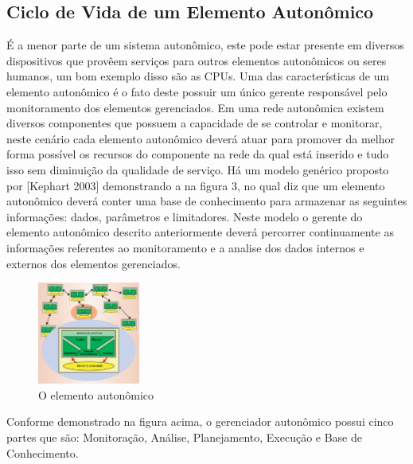 \documentclass[11pt,twoside]{article}
\begin{document}
\subsection{Ciclo de Vida de um Elemento Autonômico}
É a menor parte de um sistema autonômico, este pode estar presente em diversos dispositivos que provêem serviços para outros elementos autonômicos ou seres humanos, um bom exemplo disso são as CPUs. Uma das características de um elemento autonômico é o fato deste possuir um único gerente responsável pelo monitoramento dos elementos gerenciados. 
Em uma rede autonômica existem diversos componentes que possuem a capacidade de se controlar e monitorar, neste cenário cada elemento autonômico deverá atuar para promover da melhor forma possível os recursos do componente na rede da qual está inserido e tudo isso sem diminuição da qualidade de serviço.
Há um modelo genérico proposto por [Kephart 2003] demonstrando a na figura 3, no qual diz que um elemento autonômico deverá conter uma base de conhecimento para armazenar as seguintes informações: dados, parâmetros e limitadores. Neste modelo o gerente do elemento autonômico descrito anteriormente deverá percorrer continuamente as informações referentes ao monitoramento e a analise dos dados internos e externos dos elementos gerenciados.

\begin{figure}
    \centering
    \includegraphics[width=0.3\textwidth]{Picture3.png}
    \centering
    \caption{O elemento autonômico}
    \label{Sec:Intro:Fig1}
\end{figure}

Conforme demonstrado na figura acima, o gerenciador autonômico possui cinco partes que são: Monitoração, Análise, Planejamento, Execução e Base de Conhecimento.
\end{document}
